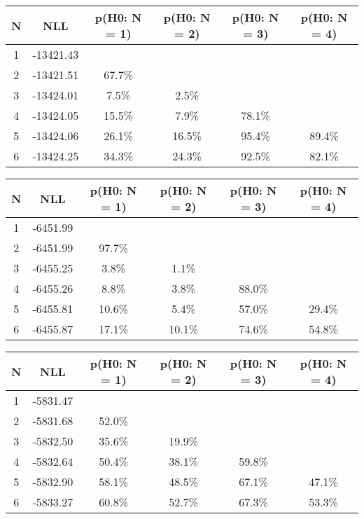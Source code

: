 \begin{table}[htb]
	\begin{center}
{\footnotesize\renewcommand{\arraystretch}{1.4}
		\begin{tabular}{cc||cccc}
			N & NLL & p(H0: N = 1) & p(H0: N = 2) & p(H0: N = 3) & p(H0: N = 4)\\ 
		\hline
1 & -13421.43 & & & & \\
2 & -13421.51 & 67.7\% & & & \\
3 & -13424.01 & 7.5\% & 2.5\% & & \\
4 & -13424.05 & 15.5\% & 7.9\% & 78.1\% & \\
5 & -13424.06 & 26.1\% & 16.5\% & 95.4\% & 89.4\% \\
6 & -13424.25 & 34.3\% & 24.3\% & 92.5\% & 82.1\% \\
	\end{tabular}
		\label{tab:lab}
	}
	\end{center}\end{table}

\begin{table}[htb]
	\begin{center}
{\footnotesize\renewcommand{\arraystretch}{1.4}
		\begin{tabular}{cc||cccc}
			N & NLL & p(H0: N = 1) & p(H0: N = 2) & p(H0: N = 3) & p(H0: N = 4)\\ 
		\hline
1 & -6451.99 & & & & \\
2 & -6451.99 & 97.7\% & & & \\
3 & -6455.25 & 3.8\% & 1.1\% & & \\
4 & -6455.26 & 8.8\% & 3.8\% & 88.0\% & \\
5 & -6455.81 & 10.6\% & 5.4\% & 57.0\% & 29.4\% \\
6 & -6455.87 & 17.1\% & 10.1\% & 74.6\% & 54.8\% \\
	\end{tabular}
		\label{tab:lab}
	}
	\end{center}\end{table}

\begin{table}[htb]
	\begin{center}
{\footnotesize\renewcommand{\arraystretch}{1.4}
		\begin{tabular}{cc||cccc}
			N & NLL & p(H0: N = 1) & p(H0: N = 2) & p(H0: N = 3) & p(H0: N = 4)\\ 
		\hline
1 & -5831.47 & & & & \\
2 & -5831.68 & 52.0\% & & & \\
3 & -5832.50 & 35.6\% & 19.9\% & & \\
4 & -5832.64 & 50.4\% & 38.1\% & 59.8\% & \\
5 & -5832.90 & 58.1\% & 48.5\% & 67.1\% & 47.1\% \\
6 & -5833.27 & 60.8\% & 52.7\% & 67.3\% & 53.3\% \\
	\end{tabular}
		\label{tab:lab}
	}
	\end{center}\end{table}


